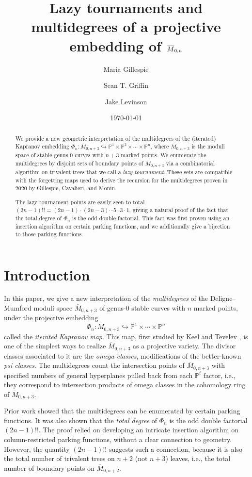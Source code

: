 \documentclass[11pt]{amsart}
\title{Lazy tournaments and multidegrees of a projective embedding of $\Mbar_{0,n}$}
\author{Maria Gillespie}
\author{Sean T. Griffin}
\author{Jake Levinson}
\date{\today}
\newcommand{\Mbar}{\overline{M}}
\newcommand{\PP}{\mathbb{P}}
\newcommand{\injto}{\hookrightarrow}
\newcommand{\emb}{\Phi}
\numberwithin{thm}{section}
\numberwithin{equation}{section}
\numberwithin{figure}{section}
\theoremstyle{definition}
\begin{document}
\maketitle{}


\begin{abstract}
     We provide a new geometric interpretation of the multidegrees of the (iterated) Kapranov embedding $\emb_n:\Mbar_{0,n+3}\injto \PP^1\times \PP^2\times \cdots \times \PP^n$, where $\Mbar_{0,n+3}$ is the moduli space of stable genus $0$ curves with $n+3$ marked points. We enumerate the multidegrees by disjoint sets of boundary points of $\Mbar_{0,n+3}$ via a combinatorial algorithm on trivalent trees that we call a \textit{lazy tournament}.  These sets are compatible with the forgetting maps used to derive the recursion for the multidegrees proven in 2020 by Gillespie, Cavalieri, and Monin.
 
 The lazy tournament points are easily seen to total $(2n-1)!!=(2n-1)\cdot (2n-3) \cdots 5 \cdot 3 \cdot 1$, giving a natural proof of the fact that the total degree of $\emb_n$ is the odd double factorial. This fact was first proven using an insertion algorithm on certain parking functions, and we additionally give a bijection to those parking functions.
\end{abstract}

\section{Introduction}

In this paper, we give a new interpretation of the \emph{multidegrees} of the Deligne--Mumford moduli space $\Mbar_{0,n+3}$ \cite{deligne-mumford1969} of genus-$0$ stable curves with $n$ marked points, under the projective embedding
\[\Phi_n : \Mbar_{0, n+3} \hookrightarrow \mathbb{P}^1 \times \cdots \times \mathbb{P}^n\]
called the \emph{iterated Kapranov map}.
This map, first studied by Keel and Tevelev \cite{KeT}, is one of the simplest ways to realize $\Mbar_{0, n+3}$ as a projective variety. The divisor classes associated to it are the \emph{omega classes}, modifications of the better-known \emph{psi classes}. The multidegrees count the intersection points of $\Mbar_{0,n+3}$ with specified numbers of general hyperplanes pulled back from each $\mathbb{P}^i$ factor, i.e., they correspond to intersection products of omega classes in the cohomology ring of $\Mbar_{0,n+3}$.

Prior work \cite{CGM} showed that the multidegrees can be enumerated by certain parking functions. It was
also shown that the \emph{total degree} of $\emb_n$ is the odd double factorial $(2n-1)!!$.  The proof relied on developing an intricate insertion algorithm on column-restricted parking functions, without a clear connection to geometry.  However, the quantity $(2n-1)!!$ suggests such a connection, because it is also the total number of trivalent trees on $n+2$ (not $n+3$) leaves, i.e., the total number of boundary points on $\Mbar_{0, n+2}$.
\end{document}

